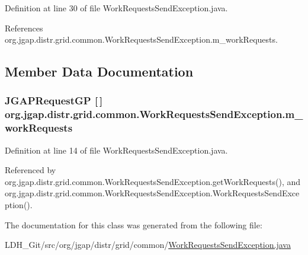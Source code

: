Definition at line 30 of file Work\-Requests\-Send\-Exception.\-java.



References org.\-jgap.\-distr.\-grid.\-common.\-Work\-Requests\-Send\-Exception.\-m\-\_\-work\-Requests.



\subsection{Member Data Documentation}
\hypertarget{classorg_1_1jgap_1_1distr_1_1grid_1_1common_1_1_work_requests_send_exception_afa585471e19bd3fe71486c745b04fd8d}{
\subsubsection[{m\-\_\-work\-Requests}]{\setlength{\rightskip}{0pt plus 5cm}J\-G\-A\-P\-Request\-G\-P \mbox{[}$\,$\mbox{]} org.\-jgap.\-distr.\-grid.\-common.\-Work\-Requests\-Send\-Exception.\-m\-\_\-work\-Requests\hspace{0.3cm}{\ttfamily [private]}}}\label{classorg_1_1jgap_1_1distr_1_1grid_1_1common_1_1_work_requests_send_exception_afa585471e19bd3fe71486c745b04fd8d}


Definition at line 14 of file Work\-Requests\-Send\-Exception.\-java.



Referenced by org.\-jgap.\-distr.\-grid.\-common.\-Work\-Requests\-Send\-Exception.\-get\-Work\-Requests(), and org.\-jgap.\-distr.\-grid.\-common.\-Work\-Requests\-Send\-Exception.\-Work\-Requests\-Send\-Exception().



The documentation for this class was generated from the following file\-:\begin{DoxyCompactItemize}
\item 
L\-D\-H\-\_\-\-Git/src/org/jgap/distr/grid/common/\hyperlink{_work_requests_send_exception_8java}{Work\-Requests\-Send\-Exception.\-java}\end{DoxyCompactItemize}
